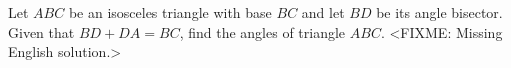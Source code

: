 \problem
Let $ABC$ be an isosceles triangle with base $BC$ and let $BD$ be its angle
bisector.
Given that $BD + DA = BC$, find the angles of triangle $ABC$. 
\solution
<FIXME: Missing English solution.>
\endproblem
